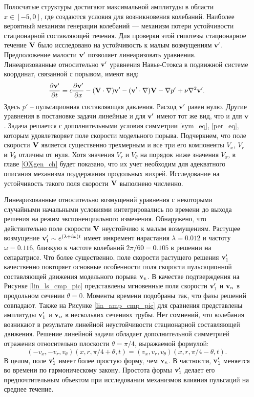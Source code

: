 Полосчатые структуры достигают максимальной амплитуды в области $x\in[-5,0]$, где создаются условия для возникновения колебаний. Наиболее вероятный механизм генерации колебаний --- механизм потери устойчивости стационарной составляющей течения. Для проверки этой гипотезы стационарное течение $\mathbf{V}$ было исследовано на устойчивость к малым возмущениям $\mathbf{v}'$. Предположение малости $\mathbf{v}'$ позволяет линеаризовать уравнения. Линеаризованные относительно $\mathbf{v}'$ уравнения Навье-Стокса в подвижной системе координат, связанной с порывом, имеют вид:
\begin{equation} \label{lin_eq}
\frac{\partial \mathbf{v}'}{\partial t} = c \frac{\partial \mathbf{v}'}{\partial x} - (\mathbf{V} \cdot \nabla) \mathbf{v}' - (\mathbf{v}' \cdot \nabla) \mathbf{V} - \nabla p' + \nu \nabla^2 \mathbf{v}'. 
\end{equation}
Здесь $p'$ -- пульсационная составляющая давления. Расход $\mathbf{v}'$ равен нулю. Другие уравнения в постановке задачи линейные и для $\mathbf{v}'$ имеют тот же вид, что и для $\mathbf{v}$. Задача решается с дополнительными условия симметрии \eqref{sym_eq}, \eqref{per_eq}, которым удовлетворяет поле скорости модельного порыва. Подчеркнем, что поле скорости $\mathbf{V}$ является существенно трехмерным и все три его компоненты $V_x$, $V_r$ и $V_\theta$ отличны от нуля. Хотя значения $V_r$ и $V_\theta$ на порядок ниже значения $V_x$, в главе \ref{OXgen_ch} будет показано, что их учет необходим для адекватного описания механизма поддержания продольных вихрей. Исследование на устойчивость такого поля скорости $\mathbf{V}$ выполнено численно. 

Линеаризованные относительно возмущений уравнения с некоторыми случайными начальными условиями интегрировались по времени до выхода решения на режим экспоненциального изменения. Обнаружено, что действительно поле скорости $\mathbf{V}$ неустойчиво к малым возмущениям. Растущее возмущение $\mathbf{v}'_1 \sim e^{(\lambda+i\omega)t}$ имеет инкремент нарастания $\lambda=0.012$ и частоту $\omega=0.116$, близкую к частоте колебаний $2\pi/60=0.105$ в решении на сепаратрисе. Что более существенно, поле скорости растущего решения $\mathbf{v}'_1$ качественно повторяет основные особенности поля скорости пульсационной составляющей движения модельного порыва $\mathbf{v}_n$. В качестве подтверждения на Рисунке \ref{lin_ls_cmp_pic} представлены мгновенные поля скорости $\mathbf{v}'_1$ и $\mathbf{v}_n$ в продольном сечении $\theta = 0$. Моменты времени подобраны так, что фазы решений совпадают. Также на Рисунке \ref{lin_amp_cmp_pic} для сравнения представлены амплитуды $\mathbf{v}_1'$ и $\mathbf{v}_n$ в нескольких сечениях трубы. Нет сомнений, что колебания возникают в результате линейной неустойчивости стационарной составляющей движения. Решение линейной задачи обладает дополнительной симметрией отражения относительно плоскости $\theta = \pi/4$, выражаемой формулой:
\begin{equation} \label{dop_sym_eq}
(-v_x, -v_r, v_\theta)(x, r, \pi/4 + \theta, t) = (v_x, v_r, v_\theta)(x, r, \pi/4 - \theta, t). 
\end{equation} 
В целом, поле $\mathbf{v}'_1$ имеет более простую форму, чем $\mathbf{v}_n$. В частности, $\mathbf{v}'_1$ меняется во времени по гармоническому закону. Простота формы $\mathbf{v}'_1$ делает его предпочтительным объектом при исследовании механизмов влияния пульсаций на среднее течение. 


